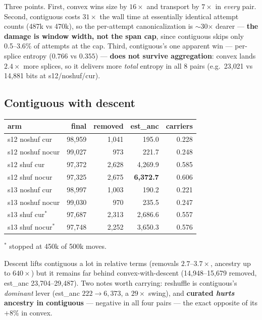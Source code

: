 \documentclass[11pt]{article}
\begin{document}
Three points. First, convex wins size by $16\times$ and transport by $7\times$
in \emph{every} pair. Second, contiguous costs $31\times$ the wall time at
essentially identical attempt counts (487k vs 470k), so the per-attempt
canonicalization is $\sim$30$\times$ dearer --- \textbf{the damage is window
width, not the span cap}, since contiguous skips only 0.5--3.6\% of attempts
at the cap. Third, contiguous's one apparent win --- per-splice entropy
($0.766$ vs $0.355$) --- \textbf{does not survive aggregation}: convex lands
$2.4\times$ more splices, so it delivers more \emph{total} entropy in all 8
pairs (e.g.\ 23{,}021 vs 14{,}881 bits at s12/noshuf/cur).

\subsection{Contiguous with descent}

\begin{center}\small
\begin{tabular}{lrrrr}
\toprule
arm & final & removed & est\_anc & carriers \\
\midrule
s12 noshuf cur & 98{,}959 & 1{,}041 & 195.0 & 0.228 \\
s12 noshuf nocur & 99{,}027 & 973 & 221.7 & 0.248 \\
s12 shuf cur & 97{,}372 & 2{,}628 & 4{,}269.9 & 0.585 \\
s12 shuf nocur & 97{,}325 & 2{,}675 & \textbf{6{,}372.7} & 0.606 \\
s13 noshuf cur & 98{,}997 & 1{,}003 & 190.2 & 0.221 \\
s13 noshuf nocur & 99{,}030 & 970 & 235.5 & 0.247 \\
s13 shuf cur$^\ast$ & 97{,}687 & 2{,}313 & 2{,}686.6 & 0.557 \\
s13 shuf nocur$^\ast$ & 97{,}748 & 2{,}252 & 3{,}650.3 & 0.576 \\
\bottomrule
\end{tabular}
\end{center}
{\small $^\ast$ stopped at 450k of 500k moves.}

Descent lifts contiguous a lot in relative terms (removals $2.7$--$3.7\times$,
ancestry up to $640\times$) but it remains far behind convex-with-descent
(14{,}948--15{,}679 removed, est\_anc 23{,}704--29{,}487). Two notes worth
carrying: reshuffle is contiguous's \emph{dominant} lever (est\_anc
$222\rightarrow6{,}373$, a $29\times$ swing), and \textbf{curated \emph{hurts}
ancestry in contiguous} --- negative in all four pairs --- the exact opposite
of its $+8\%$ in convex.
\end{document}
